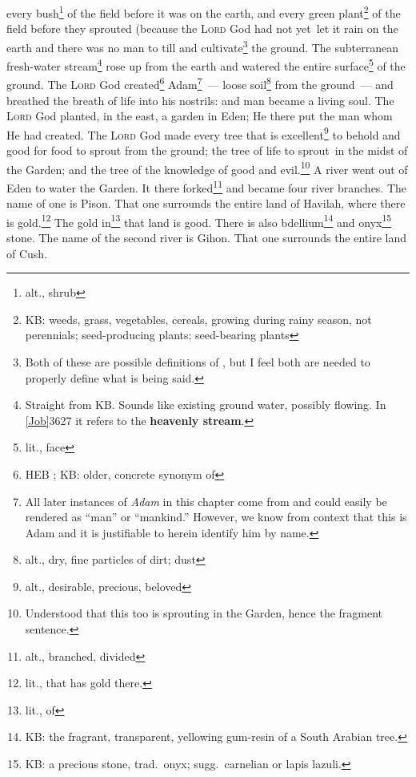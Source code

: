 \begin{inparaenum}
     every bush\footnote{alt., shrub} of the field before it was on the earth, and every green plant\footnote{KB: weeds, grass, vegetables, cereals, growing during rainy season, not perennials; seed-producing plants; seed-bearing plants} of the field before they sprouted (because the \textsc{Lord} God had not yet\understood\ let it rain on the earth and there was no man to till and cultivate\footnote{Both of these are possible definitions of , but I feel both are needed to properly define what is being said.} the ground.%
     The subterranean fresh-water stream\footnote{Straight from KB. Sounds like existing ground water, possibly flowing. In \vref{Job}{36}{27} it refers to the \textbf{heavenly stream}.} rose up from the earth and watered the entire surface\footnote{lit., face} of the ground.%
     The \textsc{Lord} God created\footnote{HEB ; KB: older, concrete synonym of } Adam\footnote{All later instances of \textit{Adam} in this chapter come from  and could easily be rendered as ``man'' or ``mankind.'' However, we know from context that this is Adam and it is justifiable to herein identify him by name.}~--- loose soil\footnote{alt., dry, fine particles of dirt; dust} from the ground~--- and breathed the breath of life into his nostrils: and man became a living soul.%
     The \textsc{Lord} God planted, in the east, a garden in Eden; He there put the man whom He had created.%
     The \textsc{Lord} God made every tree that is excellent\footnote{alt., desirable, precious, beloved} to behold and good for food to sprout from the ground; the tree of life to sprout\understood\ in the midst of the Garden; and the tree of the knowledge of good and evil.\footnote{Understood that this too is sprouting in the Garden, hence the fragment sentence.}%
     A river went out of Eden to water the Garden. It there forked\footnote{alt., branched, divided} and became four river branches.%
     The name of one is Pison. That one surrounds the entire land of Havilah, where there is gold.\footnote{lit., that has gold there.}%
     The gold in\footnote{lit., of} that land is good. There is also bdellium\footnote{KB: the fragrant, transparent, yellowing gum-resin of a South Arabian tree.} and onyx\footnote{KB: a precious stone, trad.\ onyx; sugg.\ carnelian or lapis lazuli.} stone.%
     The name of the second river is Gihon. That one surrounds the entire land of Cush.%

\end{inparaenum}
